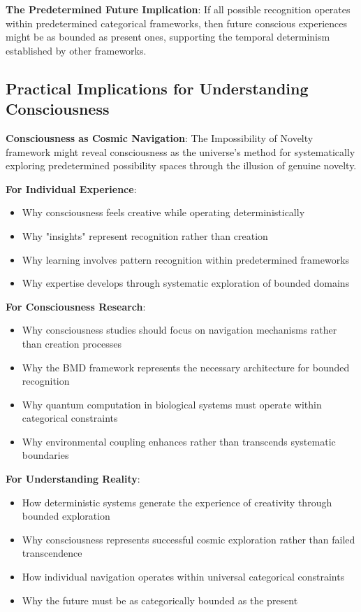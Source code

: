 \documentclass[12pt]{article}
\begin{document}
\textbf{The Predetermined Future Implication}: If all possible recognition operates within predetermined categorical frameworks, then future conscious experiences might be as bounded as present ones, supporting the temporal determinism established by other frameworks.

\subsection{Practical Implications for Understanding Consciousness}

\textbf{Consciousness as Cosmic Navigation}: The Impossibility of Novelty framework might reveal consciousness as the universe's method for systematically exploring predetermined possibility spaces through the illusion of genuine novelty.

\textbf{For Individual Experience}:
\begin{itemize}
\item Why consciousness feels creative while operating deterministically
\item Why "insights" represent recognition rather than creation
\item Why learning involves pattern recognition within predetermined frameworks
\item Why expertise develops through systematic exploration of bounded domains
\end{itemize}

\textbf{For Consciousness Research}:
\begin{itemize}
\item Why consciousness studies should focus on navigation mechanisms rather than creation processes
\item Why the BMD framework represents the necessary architecture for bounded recognition
\item Why quantum computation in biological systems must operate within categorical constraints
\item Why environmental coupling enhances rather than transcends systematic boundaries
\end{itemize}

\textbf{For Understanding Reality}:
\begin{itemize}
\item How deterministic systems generate the experience of creativity through bounded exploration
\item Why consciousness represents successful cosmic exploration rather than failed transcendence
\item How individual navigation operates within universal categorical constraints
\item Why the future must be as categorically bounded as the present
\end{itemize}
\end{document}
